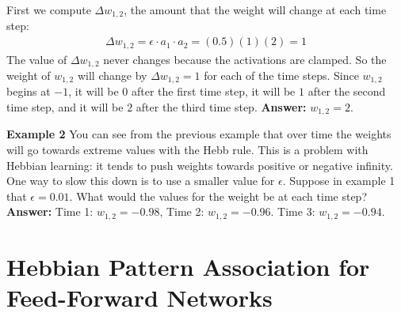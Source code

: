 First we compute $\Delta w_{1,2}$, the  amount that the weight will change at each time step:
\begin{eqnarray*}
\Delta w_{1,2} = \epsilon \cdot a_1 \cdot a_2 = (0.5)(1)(2) = 1
\end{eqnarray*}
The value of $\Delta w_{1,2}$ never changes because the activations are 
clamped. So the weight of $w_{1,2}$ will change by $\Delta w_{1,2} = 1$ for
each of the time steps. Since $w_{1,2}$ begins at $-1$, it will be $0$ after 
the first time step, it will be $1$ after the second time step, and it will be 
$2$ after the third time step. {\bf Answer:} $w_{1,2} = 2$.

\bigskip

\noindent
{\bf Example 2} You can see from the previous example that over time the weights will 
go towards extreme values with the Hebb rule. This is a problem with Hebbian 
learning: it tends to push weights towards positive or negative infinity. One way to slow 
this down is to use a smaller value for $\epsilon$. Suppose in example 1 that
$\epsilon =  0.01$. What would the values for the weight be at each time step?
{\bf Answer:} Time 1: $w_{1,2} = -0.98$, Time 2: $w_{1,2} = -0.96$. Time 3:  $w_{1,2} = -0.94$.

\section{Hebbian Pattern Association for Feed-Forward Networks}\label{ff_associator}


